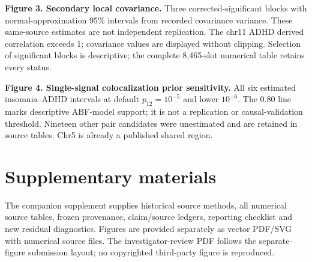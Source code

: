 \documentclass[11pt]{article}
\begin{document}
\textbf{Figure 3. Secondary local covariance.} Three corrected-significant blocks with normal-approximation 95\% intervals from recorded covariance variance. These same-source estimates are not independent replication. The chr11 ADHD derived correlation exceeds 1; covariance values are displayed without clipping. Selection of significant blocks is descriptive; the complete 8,465-slot numerical table retains every status.

\textbf{Figure 4. Single-signal colocalization prior sensitivity.} All six estimated insomnia--ADHD intervals at default $p_{12}=10^{-5}$ and lower $10^{-6}$. The 0.80 line marks descriptive ABF-model support; it is not a replication or causal-validation threshold. Nineteen other pair candidates were unestimated and are retained in source tables. Chr5 is already a published shared region.

\section*{Supplementary materials}
The companion supplement supplies historical source methods, all numerical source tables, frozen provenance, claim/source ledgers, reporting checklist and new residual diagnostics. Figures are provided separately as vector PDF/SVG with numerical source files. The investigator-review PDF follows the separate-figure submission layout; no copyrighted third-party figure is reproduced.
\end{document}
